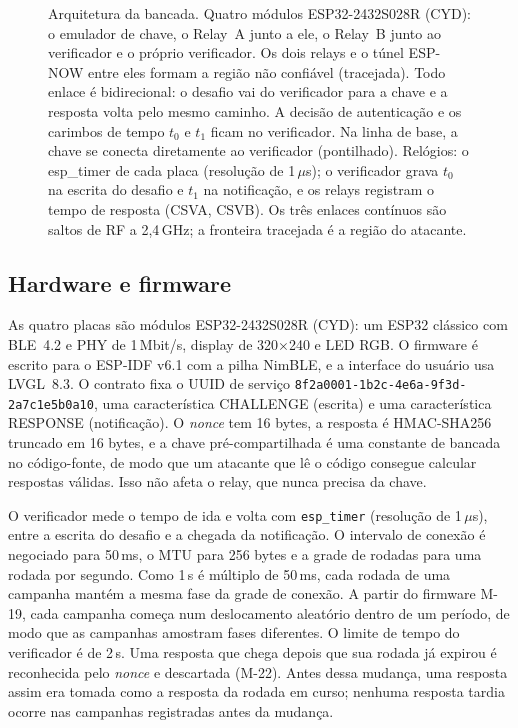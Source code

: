 \documentclass{ieeeaccess}
\begin{document}
\begin{figure}[t]
\caption{Arquitetura da bancada. Quatro módulos ESP32-2432S028R (CYD): o emulador de chave, o Relay~A junto a ele, o Relay~B junto ao verificador e o próprio verificador. Os dois relays e o túnel ESP-NOW entre eles formam a região não confiável (tracejada). Todo enlace é bidirecional: o desafio vai do verificador para a chave e a resposta volta pelo mesmo caminho. A decisão de autenticação e os carimbos de tempo $t_0$ e $t_1$ ficam no verificador. Na linha de base, a chave se conecta diretamente ao verificador (pontilhado). Relógios: o esp\_timer de cada placa (resolução de 1\,$\mu$s); o verificador grava $t_0$ na escrita do desafio e $t_1$ na notificação, e os relays registram o tempo de resposta (CSVA, CSVB). Os três enlaces contínuos são saltos de RF a 2,4\,GHz; a fronteira tracejada é a região do atacante.}
\label{fig:architecture}
\end{figure}

\subsection{Hardware e firmware}

As quatro placas são módulos ESP32-2432S028R (CYD): um ESP32 clássico com BLE~4.2 e PHY de 1\,Mbit/s, display de 320$\times$240 e LED RGB. O firmware é escrito para o ESP-IDF v6.1 com a pilha NimBLE, e a interface do usuário usa LVGL~8.3. O contrato fixa o UUID de serviço \texttt{8f2a0001-1b2c-4e6a-9f3d-2a7c1e5b0a10}, uma característica CHALLENGE (escrita) e uma característica RESPONSE (notificação). O \emph{nonce} tem 16 bytes, a resposta é HMAC-SHA256 truncado em 16 bytes, e a chave pré-compartilhada é uma constante de bancada no código-fonte, de modo que um atacante que lê o código consegue calcular respostas válidas. Isso não afeta o relay, que nunca precisa da chave.

O verificador mede o tempo de ida e volta com \texttt{esp\_timer} (resolução de 1\,$\mu$s), entre a escrita do desafio e a chegada da notificação. O intervalo de conexão é negociado para 50\,ms, o MTU para 256 bytes e a grade de rodadas para uma rodada por segundo. Como 1\,s é múltiplo de 50\,ms, cada rodada de uma campanha mantém a mesma fase da grade de conexão. A partir do firmware M-19, cada campanha começa num deslocamento aleatório dentro de um período, de modo que as campanhas amostram fases diferentes. O limite de tempo do verificador é de 2\,s. Uma resposta que chega depois que sua rodada já expirou é reconhecida pelo \emph{nonce} e descartada (M-22). Antes dessa mudança, uma resposta assim era tomada como a resposta da rodada em curso; nenhuma resposta tardia ocorre nas campanhas registradas antes da mudança.
\end{document}
